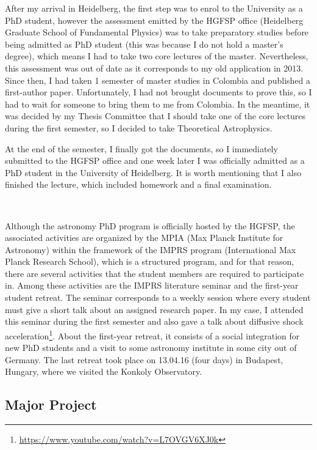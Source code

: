 \documentclass[a4,useAMS,usenatbib,usegraphicx,12pt]{article}
\begin{document}
After my arrival in Heidelberg, the first step was to enrol to the University as
a PhD student, however the assessment emitted by the HGFSP office (Heidelberg 
Graduate School of Fundamental Physics) was to take preparatory studies before 
being admitted as PhD student (this was because I do not hold a master's degree), 
which means I had to take two core lectures of the master. Nevertheless, this 
assessment was out of date as it corresponds to my old application in 2013. Since 
then, I had taken 1 semester of master studies in Colombia and published a 
first-author paper. Unfortunately, I had not brought documents to prove this, so
I had to wait for someone to bring them to me from Colombia. In the meantime,
it was decided by my Thesis Committee that I should take one of the core lectures 
during the first semester, so I decided to take Theoretical Astrophysics.

At the end of the semester, I finally got the documents, so I immediately 
submitted to the HGFSP office and one week later I was officially admitted as a
PhD student in the University of Heidelberg. It is worth mentioning that I also
finished the lecture, which included homework and a final examination.

\

Although the astronomy PhD program is officially hosted by the HGFSP, the 
associated activities are organized by the MPIA (Max Planck Institute for 
Astronomy) within the framework of the IMPRS program (International Max Planck
Research School), which is a structured program, and for that reason, there are 
several activities that the student members are required to participate in. 
Among these activities are the IMPRS literature seminar and the first-year 
student retreat. The seminar corresponds to a weekly session where every student 
must give a short talk about an assigned research paper. In my case, I attended 
this seminar during the first semester and also gave a talk about diffusive 
shock acceleration\footnote{\url{https://www.youtube.com/watch?v=L7OVGV6XJ0k}}.
About the first-year retreat, it consists of a social integration for new PhD
students and a visit to some astronomy institute in some city out of Germany.
The last retreat took place on 13.04.16 (four days) in Budapest, Hungary, where
we visited the Konkoly Observatory.


\subsection{Major Project}
\end{document}
